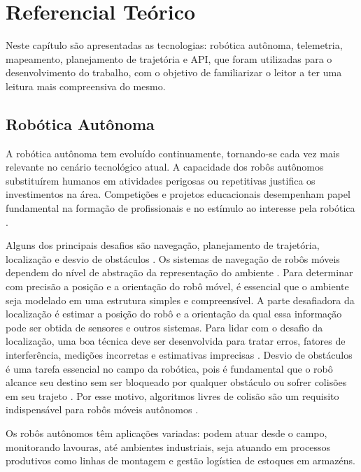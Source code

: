 \section{Referencial Teórico}
\label{sec:referencial}

Neste capítulo são apresentadas as tecnologias: robótica autônoma, telemetria, mapeamento, planejamento de trajetória e API, que foram utilizadas para o desenvolvimento do trabalho, com o objetivo de familiarizar o leitor a ter uma leitura mais compreensiva do mesmo.


\subsection{Robótica Autônoma}
A robótica autônoma tem evoluído continuamente, tornando-se cada vez mais relevante no cenário tecnológico atual. A capacidade dos robôs autônomos substituírem humanos em atividades perigosas ou repetitivas justifica os investimentos na área. Competições e projetos educacionais desempenham papel fundamental na formação de profissionais e no estímulo ao interesse pela robótica \cite{RoboAutonomo}.

Alguns dos principais desafios são navegação, planejamento de trajetória, localização e desvio de obstáculos \cite{AMRChallenges}. Os sistemas de navegação de robôs móveis dependem do nível de abstração da representação do ambiente \cite{Mapeamento}. Para determinar com precisão a posição e a orientação do robô móvel, é essencial que o ambiente seja modelado em uma estrutura simples e compreensível.
A parte desafiadora da localização é estimar a posição do robô e a orientação da qual essa informação pode ser obtida de sensores e outros sistemas. Para lidar com o desafio da localização, uma boa técnica deve ser desenvolvida para tratar erros, fatores de interferência, medições incorretas e estimativas imprecisas \cite{Odometria}. Desvio de obstáculos é uma tarefa essencial no campo da robótica, pois é fundamental que o robô alcance seu destino sem ser bloqueado por qualquer obstáculo ou sofrer colisões em seu trajeto \cite{PlanejamentoTrajetoria}. Por esse motivo, algoritmos livres de colisão são um requisito indispensável para robôs móveis autônomos \cite{IntroAR, AMRChallenges}.

Os robôs autônomos têm aplicações variadas: podem atuar desde o campo, monitorando lavouras, até ambientes industriais, seja atuando em processos produtivos como linhas de montagem e gestão logística de estoques em armazéns.

